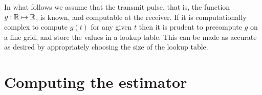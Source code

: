 \documentclass[journal]{IEEEtranTCOM}
\begin{document}
In what follows we assume that the transmit pulse, that is, the function $g : {\mathbb R} \mapsto {\mathbb R}$, is known, and computable at the receiver.  If it is computationally complex to compute $g(t)$ for any given $t$ then it is prudent to precompute $g$ on a fine grid, and store the values in a lookup table.  %
This can be made as accurate as desired by appropriately choosing the size of the lookup table. %


\section{Computing the estimator}\label{sec:computing-estimator}
\end{document}
